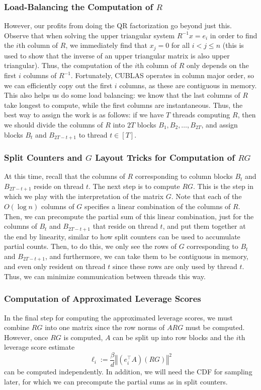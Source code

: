 \documentclass[12pt]{article}
\providecommand{\norm}[1]{\left\Vert#1\right\Vert}
\begin{document}
\subsubsection{Load-Balancing the Computation of $R$}
However, our profits from doing the QR factorization go beyond just this. Observe that when solving the upper triangular system $R^{-1}x = e_i$ in order to find the $i$th column of $R$, we immediately find that $x_j = 0$ for all $i < j\leq n$ (this is used to show that the inverse of an upper triangular matrix is also upper triangular). Thus, the computation of the $i$th column of $R$ only depends on the first $i$ columns of $R^{-1}$. Fortunately, CUBLAS operates in column major order, so we can efficiently copy out the first $i$ columns, as these are contiguous in memory. This also helps us do some load balancing: we know that the last columns of $R$ take longest to compute, while the first columns are instantaneous. Thus, the best way to assign the work is as follows: if we have $T$ threads computing $R$, then we should divide the columns of $R$ into $2T$ blocks $B_1, B_2,\dots, B_{2T}$, and assign blocks $B_t$ and $B_{2T-t+1}$ to thread $t\in[T]$.

\subsubsection{Split Counters and $G$ Layout Tricks for Computation of $RG$}
At this time, recall that the columns of $R$ corresponding to column blocks $B_t$ and $B_{2T-t+1}$ reside on thread $t$. The next step is to compute $RG$. This is the step in which we play with the interpretation of the matrix $G$. Note that each of the $O(\log n)$ columns of $G$ specifies a linear combination of the columns of $R$. Then, we can precompute the partial sum of this linear combination, just for the columns of $B_t$ and $B_{2T-t+1}$ that reside on thread $t$, and put them together at the end by linearity, similar to how split counters can be used to accumulate partial counts. Then, to do this, we only see the rows of $G$ corresponding to $B_t$ and $B_{2T-t+1}$, and furthermore, we can take them to be contiguous in memory, and even only resident on thread $t$ since these rows are only used by thread $t$. Thus, we can minimize communication between threads this way.

\subsubsection{Computation of Approximated Leverage Scores}
In the final step for computing the approximated leverage scores, we must combine $RG$ into one matrix since the row norms of $ARG$ must be computed. However, once $RG$ is computed, $A$ can be split up into row blocks and the $i$th leverage score estimate
\[
	\ell_i := \frac{\beta}{d}\norm{(e_i^\top A)(RG)}^2
\]
can be computed independently. In addition, we will need the CDF for sampling later, for which we can precompute the partial sums as in split counters. 
\end{document}

